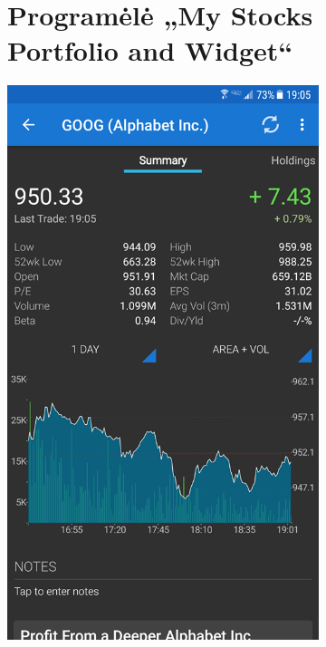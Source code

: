 \documentclass[a4paper,12pt,fleqn]{article}
\begin{document}
\begin{appendices}
\begin{figure}[h!]
\begin{subfigure}{0.5\textwidth}
		\label{app:priedas1}
	\end{subfigure}%
	\begin{subfigure}{0.5\textwidth}
		\centering
		\tocless\section{Programėlė „My Stocks Portfolio and Widget“}
		\includegraphics[scale=0.4]{priedas2.png}
		\label{app:priedas2}
	\end{subfigure}

\end{figure}
\end{appendices}
\end{document}
